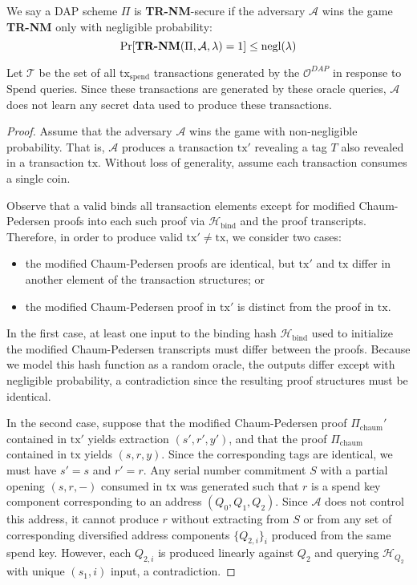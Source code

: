 \documentclass{llncs}
\newcommand{\hash}{\mathcal{H}}
\begin{document}
We say a DAP scheme $\Pi$ is \textbf{TR-NM}-secure if the adversary $\mathcal{A}$ wins the game \textbf{TR-NM} only with negligible probability:
$$\text{Pr}[\text{\textbf{TR-NM}}(\Pi, \mathcal{A}, \lambda) = 1] \leq \text{negl}(\lambda)$$

Let $\mathcal{T}$ be the set of all $\text{tx}_{\text{spend}}$ transactions generated by the $\mathcal{O}^{DAP}$ in response to $\text{Spend}$ queries.
Since these transactions are generated by these oracle queries, $\mathcal{A}$ does not learn any secret data used to produce these transactions.

\begin{proof}
Assume that the adversary $\mathcal{A}$ wins the game with non-negligible probability.
That is, $\mathcal{A}$ produces a transaction $\text{tx}'$ revealing a tag $T$ also revealed in a transaction $\text{tx}$.
Without loss of generality, assume each transaction consumes a single coin.

Observe that a valid  binds all transaction elements except for modified Chaum-Pedersen proofs into each such proof via $\hash_{\text{bind}}$ and the proof transcripts.
Therefore, in order to produce valid $\text{tx}' \neq \text{tx}$, we consider two cases:
\begin{itemize}
    \item the modified Chaum-Pedersen proofs are identical, but $\text{tx}'$ and $\text{tx}$ differ in another element of the transaction structures; or
    \item the modified Chaum-Pedersen proof in $\text{tx}'$ is distinct from the proof in $\text{tx}$.
\end{itemize}

In the first case, at least one input to the binding hash $\hash_{\text{bind}}$ used to initialize the modified Chaum-Pedersen transcripts must differ between the proofs.
Because we model this hash function as a random oracle, the outputs differ except with negligible probability, a contradiction since the resulting proof structures must be identical.

In the second case, suppose that the modified Chaum-Pedersen proof $\Pi_{\text{chaum}}'$ contained in $\text{tx}'$ yields extraction $(s',r',y')$, and that the proof $\Pi_{\text{chaum}}$ contained in $\text{tx}$ yields $(s,r,y)$.
Since the corresponding tags are identical, we must have $s' = s$ and $r' = r$.
Any serial number commitment $S$ with a partial opening $(s,r,-)$ consumed in $\text{tx}$ was generated such that $r$ is a spend key component corresponding to an address $(Q_0,Q_1,Q_2)$.
Since $\mathcal{A}$ does not control this address, it cannot produce $r$ without extracting from $S$ or from any set of corresponding diversified address components $\{Q_{2,i}\}_i$ produced from the same spend key.
However, each $Q_{2,i}$ is produced linearly against $Q_2$ and querying $\hash_{Q_2}$ with unique $(s_1,i)$ input, a contradiction.
\end{proof}
\end{document}
